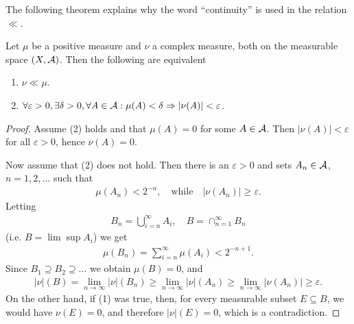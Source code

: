 \documentclass[../../main.tex]{subfiles}
\begin{document}
The following theorem explains why the word ``continuity'' is used in the relation $\ll$.

\begin{theorem}\label{thm: why it is called absolutely continuous}
Let $\mu$ be a positive measure and $\nu$ a complex measure, both on the measurable space $(X, \mathcal{A})$. Then the following are equivalent
\begin{enumerate}
\item $\nu \ll \mu$.
\item $\forall \varepsilon>0, \exists \delta > 0, \forall A\in \mathcal{A} : \mu(A)<\delta \Rightarrow |\nu(A)|<\varepsilon$.
\end{enumerate}
\end{theorem}
\begin{proof}
Assume (2) holds and that $\mu(A)=0$ for some $A\in \mathcal{A}$. Then $|\nu(A)|<\varepsilon$ for all $\varepsilon > 0$, hence $\nu(A) = 0$.

Now assume that (2) does not hold. Then there is an $\varepsilon > 0$ and sets $A_{n}\in \mathcal{A}$, $n=1, 2, \dots$ such that
\begin{align*}
	\mu(A_{n})<2^{-n}, \quad \text{while} \quad |\nu(A_{n})| \ge \varepsilon.
\end{align*}
Letting
\begin{align*}
	B_{n}=\bigcup_{i=n}^{\infty}A_{i}, \quad B=\cap_{n=1}^{\infty}B_{n}
\end{align*}
(i.e. $B=\lim\sup A_{i}$) we get
\begin{align*}
	\mu(B_{n})=\sum_{i=n}^{\infty}\mu(A_{i}) < 2^{-n+1}.
\end{align*}
Since $B_{1} \supseteq B_{2} \supseteq \dots$ we obtain $\mu(B)=0$, and
\begin{align*}
	|\nu|(B)=\lim_{n\to \infty} |\nu|(B_{n})\ge \lim_{n\to \infty} |\nu|(A_{n}) \ge \lim_{n\to \infty} |\nu(A_{n})| \ge \varepsilon.
\end{align*}
On the other hand, if (1) was true, then, for every measurable subset $E\subseteq B$, we would have $\nu(E)=0$, and therefore $|\nu|(E)=0$, which is a contradiction.
\end{proof}
\end{document}
